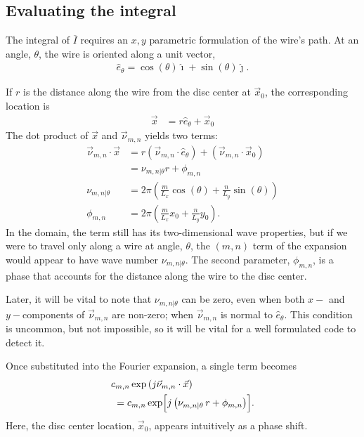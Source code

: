 \documentclass{article}
\def\I{\overline{I}}
\def\x{\vec{x}}
\def\eth{\hat{e}_\theta}
\def\vnu{\vec{\nu}_{m,n}}
\def\nuth{\nu_{m,n|\theta}}
\def\pmn{\phi_{m,n}}
\def\ui{\hat{\imath}}
\def\uj{\hat{\jmath}}
\begin{document}
\subsection{Evaluating the integral}

The integral of $\I$ requires an $x,y$ parametric formulation of the wire's path.  At an angle, $\theta$, the wire is oriented along a unit vector,
\begin{align}
\hat{e}_\theta = \cos(\theta) \ui + \sin(\theta) \uj.
\end{align}

If $r$ is the distance along the wire from the disc center at $\x_0$, the corresponding location is
\begin{align}
\x &= r \eth + \x_0
\end{align}
The dot product of $\x$ and $\vnu$ yields two terms:
\begin{align}
\vnu \cdot \x &= r (\vnu \cdot \hat{e}_\theta) + (\vnu \cdot \x_0)\nonumber\\
 &= \nu_{m,n|\theta} r + \pmn\\
\nuth &= 2\pi \left( \frac{m}{L_x} \cos(\theta) + \frac{n}{L_y} \sin(\theta) \right)\\
\pmn &= 2\pi \left( \frac{m}{L_x} x_0 + \frac{n}{L_y} y_0 \right).
\end{align}
In the domain, the term still has its two-dimensional wave properties, but if we were to travel only along a wire at angle, $\theta$, the $(m,n)$ term of the expansion would appear to have wave number $\nuth$.  The second parameter, $\pmn$, is a phase that accounts for the distance along the wire to the disc center.

Later, it will be vital to note that $\nuth$ can be zero, even when both $x-$ and $y-$components of $\vnu$ are non-zero; when $\vnu$ is normal to $\eth$.  This condition is uncommon, but not impossible, so it will be vital for a well formulated code to detect it.

Once substituted into the Fourier expansion, a single term becomes
\begin{align*}
c_{m,n} \exp\left(j \vnu \cdot \x \right)\hspace{-8em}&\\
&= c_{m,n} \exp\Bigl[j \left(\nuth\,r + \pmn \right)\Bigr].
\end{align*}
Here, the disc center location, $\x_0$, appears intuitively as a phase shift.
\end{document}
